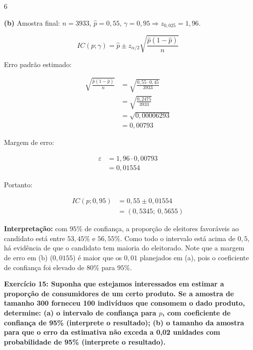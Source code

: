 \documentclass[8pt, a4paper, landscape]{extarticle}
\begin{document}
\begin{multicols}{6}
\vspace{0.2cm}

\textbf{(b)} Amostra final: $n = 3933$, $\hat{p} = 0,55$, $\gamma = 0,95 \Rightarrow z_{0,025} = 1,96$.

\begin{equation*}
IC(p;\gamma) = \hat{p} \pm z_{\alpha/2}\sqrt{\frac{\hat{p}(1-\hat{p})}{n}}
\end{equation*}

Erro padrão estimado:

\begin{equation*}
\begin{split}
\sqrt{\frac{\hat{p}(1-\hat{p})}{n}} &= \sqrt{\frac{0,55 \cdot 0,45}{3933}} \\
&= \sqrt{\frac{0,2475}{3933}} \\
&= \sqrt{0,00006293} \\
&= 0,00793
\end{split}
\end{equation*}

Margem de erro:

\begin{equation*}
\begin{split}
\varepsilon &= 1,96 \cdot 0,00793 \\
&= 0,01554
\end{split}
\end{equation*}

Portanto:

\begin{equation*}
\begin{split}
IC(p;0,95) &= 0,55 \pm 0,01554 \\
&= (0,5345;\ 0,5655)
\end{split}
\end{equation*}

\textbf{Interpretação:} com $95\%$ de confiança, a proporção de eleitores favoráveis ao candidato está entre $53,45\%$ e $56,55\%$. Como todo o intervalo está acima de $0,5$, há evidência de que o candidato tem maioria do eleitorado. Note que a margem de erro em (b) ($0,0155$) é maior que os $0,01$ planejados em (a), pois o coeficiente de confiança foi elevado de $80\%$ para $95\%$.

\textbf{Exercício 15: Suponha que estejamos interessados em estimar a proporção de consumidores de um certo produto. Se a amostra de tamanho 300 forneceu 100 indivíduos que consomem o dado produto, determine: (a) o intervalo de confiança para $p$, com coeficiente de confiança de 95\% (interprete o resultado); (b) o tamanho da amostra para que o erro da estimativa não exceda a 0,02 unidades com probabilidade de 95\% (interprete o resultado).}


\end{multicols}
\end{document}
